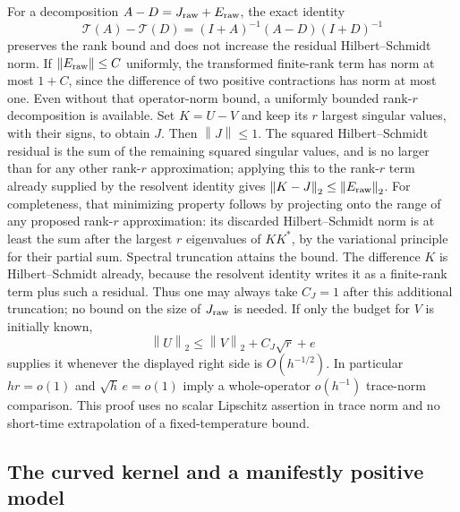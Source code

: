 \documentclass[aps,pra,reprint,superscriptaddress,longbibliography]{revtex4-2}
\newcommand{\norm}[1]{\left\lVert#1\right\rVert}
\begin{document}
For a decomposition $A-D=J_{\rm raw}+E_{\rm raw}$, the exact identity
\begin{equation}
 \mathcal T(A)-\mathcal T(D)=(I+A)^{-1}(A-D)(I+D)^{-1}
 \label{sgt:geo:resolvent-identity}
\end{equation}
preserves the rank bound and does not increase the residual
Hilbert--Schmidt norm.  If $\norm{E_{\rm raw}}\leq C$ uniformly, the
transformed finite-rank term has norm at most $1+C$, since the
difference of two positive contractions has norm at most one.
Even without that operator-norm bound, a uniformly bounded rank-$r$
decomposition is available.  Set $K=U-V$ and keep its $r$ largest
singular values, with their signs, to obtain $J$.  Then $\norm{J}\leq1$.
The squared Hilbert--Schmidt residual is the sum of the remaining
squared singular values, and is no larger than for any other rank-$r$
approximation; applying this to the rank-$r$ term already supplied by
the resolvent identity gives $\norm{K-J}_2\leq\norm{E_{\rm raw}}_2$.
For completeness, that minimizing property follows by projecting onto
the range of any proposed rank-$r$ approximation: its discarded
Hilbert--Schmidt norm is at least the sum after the largest $r$
eigenvalues of $KK^*$, by the variational principle for their partial
sum.  Spectral truncation attains the bound.  The difference $K$ is
Hilbert--Schmidt already, because the resolvent identity writes it as
a finite-rank term plus such a residual.  Thus one may always take
$C_J=1$ after this additional truncation; no bound on the size of
$J_{\rm raw}$ is needed.  If only the budget for $V$ is initially known,
\[
 \norm{U}_2\leq\norm{V}_2+C_J\sqrt r+e
\]
supplies it whenever the displayed right side is $O(h^{-1/2})$.
In particular $hr=o(1)$ and $\sqrt h\,e=o(1)$ imply a whole-operator
$o(h^{-1})$ trace-norm comparison.  This proof uses no scalar
Lipschitz assertion in trace norm and no short-time extrapolation of
a fixed-temperature bound.

\subsection{The curved kernel and a manifestly positive model}
\label{sgt:geo:kernel}
\end{document}

